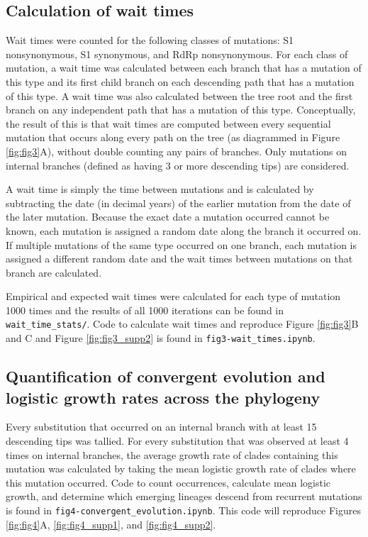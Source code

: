 \documentclass[12pt, letterpaper]{article}
\begin{document}
\subsection*{Calculation of wait times}
Wait times were counted for the following classes of mutations: S1 nonsynonymous, S1 synonymous, and RdRp nonsynonymous. For each class of mutation, a wait time was calculated between each branch that has a mutation of this type and its first child branch on each descending path that has a mutation of this type. A wait time was also calculated between the tree root and the first branch on any independent path that has a mutation of this type. Conceptually, the result of this is that wait times are computed between every sequential mutation that occurs along every path on the tree (as diagrammed in Figure \ref{fig:fig3}A), without double counting any pairs of branches. Only mutations on internal branches (defined as having 3 or more descending tips) are considered.

A wait time is simply the time between mutations and is calculated by subtracting the date (in decimal years) of the earlier mutation from the date of the later mutation. Because the exact date a mutation occurred cannot be known, each mutation is assigned a random date along the branch it occurred on. If multiple mutations of the same type occurred on one branch, each mutation is assigned a different random date and the wait times between mutations on that branch are calculated.

Empirical and expected wait times were calculated for each type of mutation 1000 times and the results of all 1000 iterations can be found in \texttt{wait\_time\_stats/}. Code to calculate wait times and reproduce Figure \ref{fig:fig3}B and C and Figure \ref{fig:fig3_supp2} is found in \texttt{fig3-wait\_times.ipynb}.

\subsection*{Quantification of convergent evolution and logistic growth rates across the phylogeny}
Every substitution that occurred on an internal branch with at least 15 descending tips was tallied. For every substitution that was observed at least 4 times on internal branches, the average growth rate of clades containing this mutation was calculated by taking the mean logistic growth rate of clades where this mutation occurred. Code to count occurrences, calculate mean logistic growth, and determine which emerging lineages descend from recurrent mutations is found in \texttt{fig4-convergent\_evolution.ipynb}. This code will reproduce Figures \ref{fig:fig4}A, \ref{fig:fig4_supp1}, and \ref{fig:fig4_supp2}.
\end{document}
